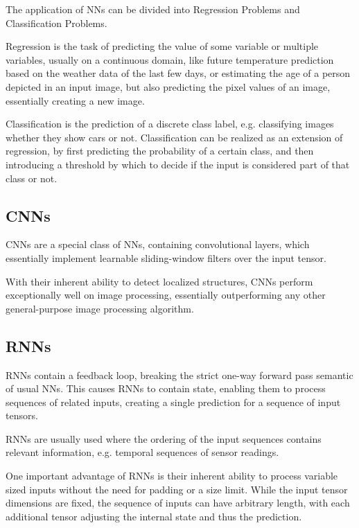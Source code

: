 The application of \glspl{NN} can be divided into Regression Problems and Classification Problems. 

Regression is the task of predicting the value of some variable or multiple variables, usually on a continuous domain, like future temperature prediction based on the weather data of the last few days, or estimating the age of a person depicted in an input image, but also predicting the pixel values of an image, essentially creating a new image.

Classification is the prediction of a discrete class label, e.g. classifying images whether they show cars or not. Classification can be realized as an extension of regression, by first predicting the probability of a certain class, and then introducing a threshold by which to decide if the input is considered part of that class or not.

\subsection{\glspl{CNN}}

\glspl{CNN} are a special class of \glspl{NN}, containing convolutional layers, which essentially implement learnable sliding-window filters over the input tensor. 

With their inherent ability to detect localized structures, \glspl{CNN} perform exceptionally well on image processing, essentially outperforming any other general-purpose image processing algorithm.\cite{dl-vs-cv}\cite{cv-vs-dl}

\subsection{\glspl{RNN}}

\glspl{RNN} contain a feedback loop, breaking the strict one-way forward pass semantic of usual \glspl{NN}. This causes \glspl{RNN} to contain state, enabling them to process sequences of related inputs, creating a single prediction for a sequence of input tensors.

\glspl{RNN} are usually used where the ordering of the input sequences contains relevant information, e.g. temporal sequences of sensor readings.

One important advantage of \glspl{RNN} is their inherent ability to process variable sized inputs without the need for padding or a size limit. While the input tensor dimensions are fixed, the sequence of inputs can have arbitrary length, with each additional tensor adjusting the internal state and thus the prediction.

